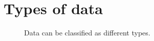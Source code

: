 \documentclass[
  a4paper,
]{scrbook}
\begin{document}
\section{Types of data}\label{types-of-data}

\begin{figure}[H]


\caption{\label{fig-datatypes}Data can be classified as different
types.}

\end{figure}%
\end{document}

